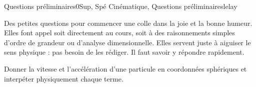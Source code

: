 
\begin{exercise}{Questions préliminaires}{0}{Sup, Spé}
{Cinématique, Questions préliminaires}{lelay}

Des petites questions pour commencer une colle dans la joie et la bonne humeur. Elles font appel soit directement au cours, soit à des raisonnements simples d'ordre de grandeur ou d'analyse dimensionnelle. Elles servent juste à aiguiser le sens physique : pas besoin de les rédiger. Il faut savoir y répondre rapidement.

\begin{questions}
    \question Donner la vitesse et l'accélération d'une particule en coordonnées sphériques et interpéter physiquement chaque terme.
\end{questions}
\end{exercise}